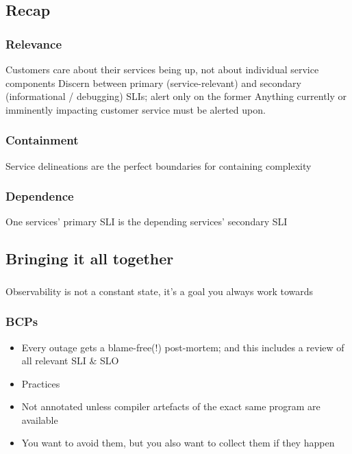 \documentclass[t]{beamer}
\begin{document}
\subsection{Recap}

\begin{frame}
	\frametitle{Relevance}
	\begin{center}
		\vfill
		Customers care about their services being up, not about individual service components
		\vfill
		Discern between primary (service-relevant) and secondary (informational / debugging) SLIs; alert only on the former
		\vfill
		Anything currently or imminently impacting customer service must be alerted upon.
		\vfill
	\end{center}
\end{frame}

\begin{frame}
	\frametitle{Containment}
	\begin{center}
		\vfill
		Service delineations are the perfect boundaries for containing complexity
		\vfill
	\end{center}
\end{frame}

\begin{frame}
	\frametitle{Dependence}
	\begin{center}
		\vfill
		One services' primary SLI is the depending services' secondary SLI
		\vfill
	\end{center}
\end{frame}


\subsection{Bringing it all together}

\begin{frame}
	\frametitle{}
	\begin{center}
		\vfill
		Observability is not a constant state, it's a goal you always work towards
		\vfill
	\end{center}
\end{frame}

\begin{frame}
	\frametitle{BCPs}
	\begin{itemize}
		\item Every outage gets a blame-free(!) post-mortem; and this includes a review of all relevant SLI \& SLO
		\item Practices
		\item Not annotated unless compiler artefacts of the exact same program are available
		\item You want to avoid them, but you also want to collect them if they happen
	\end{itemize}
\end{frame}
\end{document}
